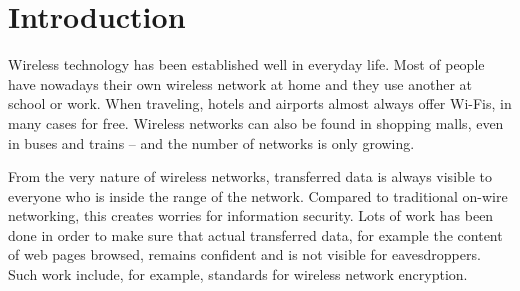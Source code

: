 \documentclass[12pt,a4paper,oneside,pdftex]{report}
\begin{document}
\cleardoublepage
\tableofcontents



\label{pages-prelude}
\cleardoublepage

\startfirstchapter

\pagestyle{headings}




\chapter{Introduction}
\label{chapter:intro}

Wireless technology has been established well in everyday life. Most of people have nowadays their own wireless network at home and they use another at school or work. When traveling, hotels and airports almost always offer Wi-Fis, in many cases for free. Wireless networks can also be found in shopping malls, even in buses and trains -- and the number of networks is only growing.

From the very nature of wireless networks, transferred data is always visible to everyone who is inside the range of the network. Compared to traditional on-wire networking, this creates worries for information security. Lots of work has been done in order to make sure that actual transferred data, for example the content of web pages browsed, remains confident and is not visible for eavesdroppers. Such work include, for example, standards for wireless network encryption.
\end{document}
